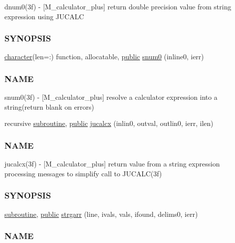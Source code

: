 \begin{DoxyCompactItemize}
\begin{DoxyCompactList}
dnum0(3f) -\/ \mbox{[}M\+\_\+calculator\+\_\+plus\mbox{]} return double precision value from string expression using J\+U\+C\+A\+LC \subsubsection*{S\+Y\+N\+O\+P\+S\+IS}\end{DoxyCompactList}\item 
\hyperlink{option__stopwatch_83_8txt_abd4b21fbbd175834027b5224bfe97e66}{character}(len=\+:) function, allocatable, \hyperlink{M__stopwatch_83_8txt_a2f74811300c361e53b430611a7d1769f}{public} \hyperlink{namespacem__calculator__plus_a2538e7f9f0b810f7f8dbdd80fa2444b3}{snum0} (inline0, ierr)
\begin{DoxyCompactList}\small\item\em \subsubsection*{N\+A\+ME}

snum0(3f) -\/ \mbox{[}M\+\_\+calculator\+\_\+plus\mbox{]} resolve a calculator expression into a string(return blank on errors) \end{DoxyCompactList}\item 
recursive \hyperlink{M__stopwatch_83_8txt_acfbcff50169d691ff02d4a123ed70482}{subroutine}, \hyperlink{M__stopwatch_83_8txt_a2f74811300c361e53b430611a7d1769f}{public} \hyperlink{namespacem__calculator__plus_ac6f5a1bd3d8be798af932c006a72b123}{jucalcx} (inlin0, outval, outlin0, ierr, ilen)
\begin{DoxyCompactList}\small\item\em \subsubsection*{N\+A\+ME}

jucalcx(3f) -\/ \mbox{[}M\+\_\+calculator\+\_\+plus\mbox{]} return value from a string expression processing messages to simplify call to J\+U\+C\+A\+L\+C(3f) \subsubsection*{S\+Y\+N\+O\+P\+S\+IS}\end{DoxyCompactList}\item 
\hyperlink{M__stopwatch_83_8txt_acfbcff50169d691ff02d4a123ed70482}{subroutine}, \hyperlink{M__stopwatch_83_8txt_a2f74811300c361e53b430611a7d1769f}{public} \hyperlink{namespacem__calculator__plus_a4d3424e0cb74d4af53e7f59c07d31f1b}{strgarr} (line, ivals, vals, ifound, delims0, ierr)
\begin{DoxyCompactList}\small\item\em \subsubsection*{N\+A\+ME}


\end{DoxyCompactList}
\end{DoxyCompactItemize}
